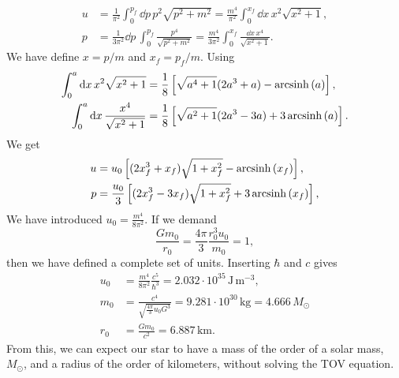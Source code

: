 %
\begin{align}
    u &= \frac{1}{\pi^2} \int_0^{p_f} \dd p \,
    p^2 \sqrt{p^2 + m^2}
    = \frac{m^4}{\pi^2} \int_0^{x_f} \dd x \, x^2 \sqrt{x^2 + 1}, \\
    p & = \frac{1}{3 \pi^2} \dd p \, \int_0^{p_f}\frac{p^4}{\sqrt{p^2 + m^2}} 
    = \frac{m^4}{3 \pi^2} \int_0^{x_f} \frac{\dd x \, x^4}{\sqrt{x^2 + 1}}.
\end{align}
% 
We have define $x = p / m$ and $x_f = p_f/m$.
Using 
%
\begin{align}
    \int_0^a \text{d} x \, x^2 \sqrt{x^2 + 1} 
    & = \frac{1}{8} 
    \left[\sqrt{a^4 + 1}(2 a^3 + a) - \operatorname{arcsinh}\left(a\right)\right], \\
    \int_0^a \text{d} x \, \frac{x^4}{\sqrt{x^2 + 1} }
    & = \frac{1}{8} 
    \left[\sqrt{a^2 + 1}(2 a^3 - 3a) + 3\operatorname{arcsinh}\left(a\right)\right].
\end{align}
%
We get 
%
\begin{align}
    u &= u_0
    \left[(2x_f^3 + x_f) \sqrt{1 + x_f^2} - \operatorname{arcsinh}\left(x_f\right)\right], \\
    p &= \frac{u_0}{3}
    \left[(2x_f^3 - 3x_f) \sqrt{1 + x_f^2} + 3\operatorname{arcsinh}\left(x_f\right)\right],
\end{align}
%
We have introduced $u_0 = \frac{m^4}{8 \pi^2}$.
If we demand
%
\begin{equation}
    \frac{G m_0}{r_0} = \frac{4 \pi }{3}\frac{r_0^3 u_0}{m_0} = 1,
\end{equation}
%
then we have defined a complete set of units.
Inserting $\hbar$ and $c$ gives
%
\begin{align}
    u_0 &= \frac{m^4}{8 \pi^2}\frac{c^5}{\hbar^3} 
    = 2.032\cdot10^{35}  \, \text{J}\,\text{m}^{-3}, \\
    m_0 &= \frac{c^4}{\sqrt{\frac{4 \pi}{3} u_0 G^3} }
    = 9.281 \cdot 10^{30} \, \text{kg}
    = 4.666 \, M_\odot \\ %
    r_0 &= \frac{G m_0}{c^2} = 6.887 \, \text{km}. %
\end{align}
%
From this, we can expect our star to have a mass of the order of a solar mass, $M_\odot$, and a radius of the order of kilometers, without solving the TOV equation.
